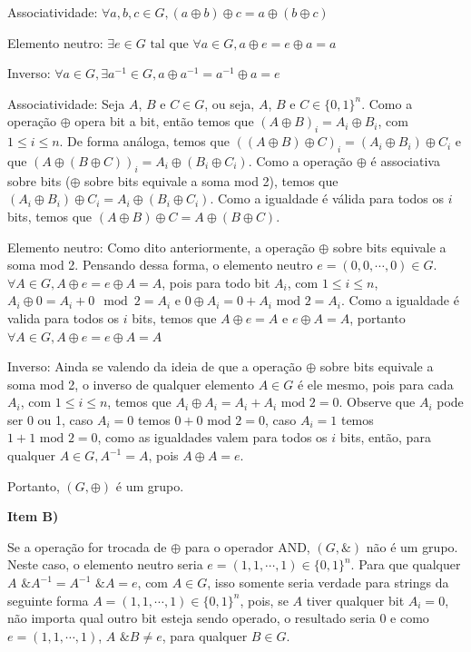 \documentclass{article}
\begin{document}
    Associatividade: $\forall a,b,c \in G, (a \oplus b) \oplus c = a \oplus (b \oplus c)$

    Elemento neutro: $\exists e \in G \text{ tal que } \forall a \in G, a \oplus e = e \oplus a = a$

    Inverso: $\forall a \in G, \exists a^{-1} \in G, a \oplus a^{-1} = a^{-1} \oplus a = e$

    Associatividade: Seja $A$, $B$ e $C \in G$, ou seja, $A$, $B$ e $C \in \{0,1\}^n$. Como a operação $\oplus$ opera bit a bit, então temos que $(A \oplus B)_i = A_i \oplus B_i$, com $1 \leq i \leq n$. De forma análoga, temos que $((A \oplus B) \oplus C)_i = (A_i \oplus B_i) \oplus C_i$ e que $(A \oplus (B \oplus C))_i = A_i \oplus (B_i \oplus C_i)$. Como a operação $\oplus$ é associativa sobre bits ($\oplus$ sobre bits equivale a soma mod 2), temos que $(A_i \oplus B_i) \oplus C_i = A_i \oplus (B_i \oplus C_i)$. Como a igualdade é válida para todos os $i$ bits, temos que $(A \oplus B) \oplus C = A \oplus (B \oplus C)$.

    Elemento neutro: Como dito anteriormente, a operação $\oplus$ sobre bits equivale a soma mod 2. Pensando dessa forma, o elemento neutro $e = (0,0,\cdots, 0) \in G$. $\forall A \in G, A \oplus e = e \oplus A = A$, pois para todo bit $A_i$, com $1 \leq i \leq n$, $A_i \oplus 0 = A_i + 0 \mod 2 = A_i$ e $0 \oplus A_i = 0 + A_i \text{ mod } 2 = A_i$. Como a igualdade é valida para todos os $i$ bits, temos que $A \oplus e = A$ e $e \oplus A = A$, portanto $\forall A \in G, A \oplus e = e \oplus A = A$

    Inverso: Ainda se valendo da ideia de que a operação $\oplus$ sobre bits equivale a soma mod 2, o inverso de qualquer elemento $A \in G$ é ele mesmo, pois para cada $A_i$, com $1 \leq i \leq n$, temos que $A_i \oplus A_i = A_i + A_i \text{ mod } 2 = 0$. Observe que $A_i$ pode ser 0 ou 1, caso $A_i = 0$ temos $0 + 0 \text{ mod } 2 = 0$, caso $A_i = 1$ temos $1 + 1 \text{ mod } 2 = 0$, como as igualdades valem para todos os $i$ bits, então, para qualquer $A \in G, A^{-1} = A$, pois $A \oplus A = e$. 

    Portanto, $(G, \oplus)$ é um grupo.

\textbf{Item B)}

    Se a operação for trocada de $\oplus$ para o operador AND, $(G,\&)$ não é um grupo. Neste caso, o elemento neutro seria $e = (1,1,\cdots,1) \in \{0,1\}^n$. Para que qualquer $A \text{ \& } A^{-1} = A^{-1} \text{ \& } A = e$, com $A \in G$, isso somente seria verdade para strings da seguinte forma $A = (1, 1, \cdots, 1) \in \{0,1\}^n$, pois, se $A$ tiver qualquer bit $A_i = 0$, não importa qual outro bit esteja sendo operado, o resultado seria 0 e como $e = (1,1,\cdots, 1)$, $A \text{ \& } B \neq e$, para qualquer $B \in G$.
    
\end{document}
